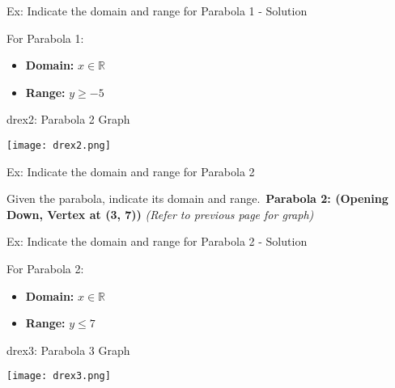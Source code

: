 \documentclass[aspectratio=169]{beamer}
\begin{document}
\begin{frame}{Ex: Indicate the domain and range for Parabola 1 - Solution}
    \begin{tcolorbox}[colback=lightgray,colframe=accent,title=Detailed Solution]
        \footnotesize
        For Parabola 1:\
        \begin{itemize}
            \item \textbf{Domain:} $x \in \mathbb{R}$
            \item \textbf{Range:} $y \ge -5$
        \end{itemize}
    \end{tcolorbox}
\end{frame}

\begin{frame}{drex2: Parabola 2 Graph}
    \begin{tcolorbox}[colback=lightgray,colframe=primary,title=Visual Representation]
        \centering
        \texttt{[image: drex2.png]}
    \end{tcolorbox}
\end{frame}

\begin{frame}{Ex: Indicate the domain and range for Parabola 2}
    \begin{tcolorbox}[colback=lightgray,colframe=primary,title=Problem]
        \footnotesize
        Given the parabola, indicate its domain and range.\
        \textbf{Parabola 2: (Opening Down, Vertex at (3, 7))}
        \textit{(Refer to previous page for graph)}
    \end{tcolorbox}
\end{frame}

\begin{frame}{Ex: Indicate the domain and range for Parabola 2 - Solution}
    \begin{tcolorbox}[colback=lightgray,colframe=accent,title=Detailed Solution]
        \footnotesize
        For Parabola 2:\
        \begin{itemize}
            \item \textbf{Domain:} $x \in \mathbb{R}$
            \item \textbf{Range:} $y \le 7$
        \end{itemize}
    \end{tcolorbox}
\end{frame}

\begin{frame}{drex3: Parabola 3 Graph}
    \begin{tcolorbox}[colback=lightgray,colframe=primary,title=Visual Representation]
        \centering
        \texttt{[image: drex3.png]}
    \end{tcolorbox}
\end{frame}
\end{document}
